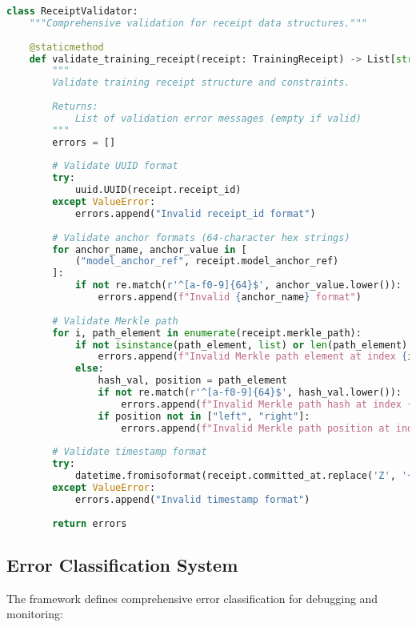 \documentclass[12pt,a4paper]{article}
\begin{document}
\begin{lstlisting}[language=Python, caption=Receipt Validation Framework]
class ReceiptValidator:
    """Comprehensive validation for receipt data structures."""
    
    @staticmethod
    def validate_training_receipt(receipt: TrainingReceipt) -> List[str]:
        """
        Validate training receipt structure and constraints.
        
        Returns:
            List of validation error messages (empty if valid)
        """
        errors = []
        
        # Validate UUID format
        try:
            uuid.UUID(receipt.receipt_id)
        except ValueError:
            errors.append("Invalid receipt_id format")
        
        # Validate anchor formats (64-character hex strings)
        for anchor_name, anchor_value in [
            ("model_anchor_ref", receipt.model_anchor_ref)
        ]:
            if not re.match(r'^[a-f0-9]{64}$', anchor_value.lower()):
                errors.append(f"Invalid {anchor_name} format")
        
        # Validate Merkle path
        for i, path_element in enumerate(receipt.merkle_path):
            if not isinstance(path_element, list) or len(path_element) != 2:
                errors.append(f"Invalid Merkle path element at index {i}: must be [hash, position]")
            else:
                hash_val, position = path_element
                if not re.match(r'^[a-f0-9]{64}$', hash_val.lower()):
                    errors.append(f"Invalid Merkle path hash at index {i}")
                if position not in ["left", "right"]:
                    errors.append(f"Invalid Merkle path position at index {i}: must be 'left' or 'right'")
        
        # Validate timestamp format
        try:
            datetime.fromisoformat(receipt.committed_at.replace('Z', '+00:00'))
        except ValueError:
            errors.append("Invalid timestamp format")
        
        return errors
\end{lstlisting}

\subsection{Error Classification System}

The framework defines comprehensive error classification for debugging and monitoring:
\end{document}
